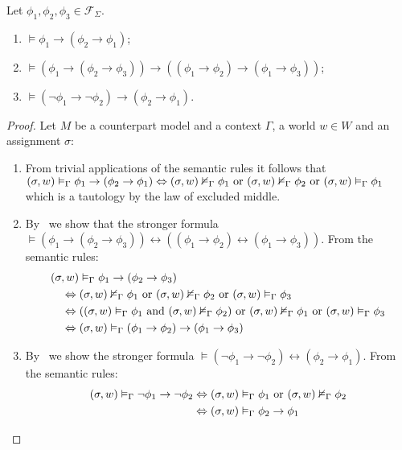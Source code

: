\begin{lemma}\label{lem:propaxioms}
  Let $\phi_1, \phi_2, \phi_3 \in \mathcal{F}_\Sigma$.
  \begin{enumerate}
    \item $\vDash \phi_1 \to (\phi_2 \to \phi_1)$;
    \item $\vDash (\phi_1 \to (\phi_2 \to \phi_3)) \to ((\phi_1 \to \phi_2) \to (\phi_1 \to \phi_3))$;
    \item $\vDash (\neg\phi_1 \to \neg\phi_2) \to (\phi_2 \to \phi_1)$.
  \end{enumerate}
\end{lemma}
\begin{proof}
  Let $M$ be a counterpart model and a context $\Gamma$, a world $w \in W$ and an assignment $\sigma$:
  \begin{enumerate}
    \item From trivial applications of the semantic rules it follows that $({\sigma}, {w}) \vDash_{\Gamma} {\phi_1 \to (\phi_2
      \to \phi_1)} \Leftrightarrow ({\sigma}, {w}) \nvDash_{\Gamma} {\phi_1} \text{ or } ({\sigma}, {w}) \nvDash_{\Gamma} {\phi_2}
      \text{ or } ({\sigma}, {w}) \vDash_{\Gamma} {\phi_1}$ which is a tautology by the law of excluded middle.

    \item By~ we show that the stronger formula $\vDash (\phi_1 \to (\phi_2 \to \phi_3)) \leftrightarrow ((\phi_1 \to \phi_2)
      \leftrightarrow (\phi_1 \to \phi_3))$. From the semantic rules:
      \[
        \begin{split}
          &({\sigma}, {w}) \vDash_{\Gamma} {\phi_1 \to (\phi_2 \to \phi_3)} \\
            &\quad\Leftrightarrow ({\sigma}, {w}) \nvDash_{\Gamma} {\phi_1} \text{ or } ({\sigma}, {w}) \nvDash_{\Gamma} {\phi_2} \text{ or }
              ({\sigma}, {w}) \vDash_{\Gamma} {\phi_3} \\
            &\quad\Leftrightarrow (({\sigma}, {w}) \vDash_{\Gamma} {\phi_1} \text{ and } ({\sigma}, {w}) \nvDash_{\Gamma} {\phi_2}) \text{ or }
              ({\sigma}, {w}) \nvDash_{\Gamma} {\phi_1} \text{ or } ({\sigma}, {w}) \vDash_{\Gamma} {\phi_3} \\
            &\quad\Leftrightarrow ({\sigma}, {w}) \vDash_{\Gamma} {(\phi_1 \to \phi_2) \to (\phi_1 \to \phi_3)}
        \end{split}
      \]

    \item By~ we show the stronger formula $\vDash (\neg\phi_1 \to \neg\phi_2) \leftrightarrow (\phi_2 \to \phi_1)$.
      From the semantic rules:
      \[
        \begin{split}
          ({\sigma}, {w}) \vDash_{\Gamma} {\neg\phi_1 \to \neg\phi_2}
            &\Leftrightarrow ({\sigma}, {w}) \vDash_{\Gamma} {\phi_1} \text{ or } ({\sigma}, {w}) \nvDash_{\Gamma} {\phi_2} \\
            &\Leftrightarrow ({\sigma}, {w}) \vDash_{\Gamma} {\phi_2 \to \phi_1}
        \end{split}
      \]
  \end{enumerate}
\end{proof}

